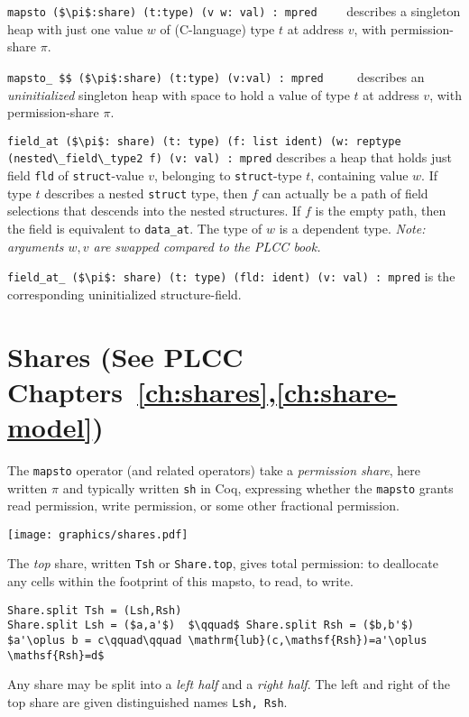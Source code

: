 \documentclass[12pt,fleqn,openany,oneside,showtrims]{memoir}
\newcommand{\ychapter}[2]{\chapter[#1]{#1 \hfill \normalsize #2}}
\begin{document}
\noindent \lstinline{mapsto ($\pi$:share) (t:type) (v w: val) : mpred}
$\qquad$describes a singleton heap with
just one value $w$ of (C-language) type $t$
at address $v$, with permission-share $\pi$.

\noindent \lstinline{mapsto_ $$ ($\pi$:share) (t:type) (v:val) : mpred}
$\qquad$
describes an \emph{uninitialized} singleton heap with
space to hold a value of type $t$
at address $v$, with permission-share $\pi$.

\noindent
\lstinline{field_at ($\pi$: share) (t: type) (f: list ident) (w: reptype (nested\_field\_type2 f) (v: val) : mpred}
\newline  describes a heap
that holds just field \lstinline{fld} 
of \lstinline{struct}-value $v$,
belonging to \lstinline{struct}-type $t$, 
containing value $w$.
If type $t$ describes a nested \lstinline{struct} type,
then $f$ can actually be a path of field selections
that descends into the nested structures.
If $f$ is the empty path, then the field is equivalent to
\lstinline{data_at}.
The type of $w$ is a dependent type.
\emph{Note: arguments $w,v$ are swapped compared to the PLCC book.}

\lstinline{field_at_ ($\pi$: share) (t: type) (fld: ident) (v: val) : mpred}
\newline is the corresponding uninitialized structure-field.

\ychapter{Shares}{(See PLCC Chapters~\ref{ch:shares},\ref{ch:share-model})}
The \lstinline{mapsto} operator (and related operators) take a
\emph{permission share}, here written $\pi$ and typically
written \lstinline{sh} in Coq, expressing whether
the \lstinline{mapsto} grants read permission, write permission,
or some other fractional permission.

\centerline{\texttt{[image: graphics/shares.pdf]}}

The \emph{top} share, written \lstinline{Tsh} or
\lstinline{Share.top}, gives total permission: to deallocate any cells
within the footprint of this mapsto, to read, to write.

\begin{lstlisting}
Share.split Tsh = (Lsh,Rsh)
Share.split Lsh = ($a,a'$)  $\qquad$ Share.split Rsh = ($b,b'$)
$a'\oplus b = c\qquad\qquad \mathrm{lub}(c,\mathsf{Rsh})=a'\oplus \mathsf{Rsh}=d$
\end{lstlisting}
Any share may be split into a \emph{left half} and a \emph{right half}.
The left and right of the top share are given distinguished names
\lstinline{Lsh, Rsh}.
\end{document}
